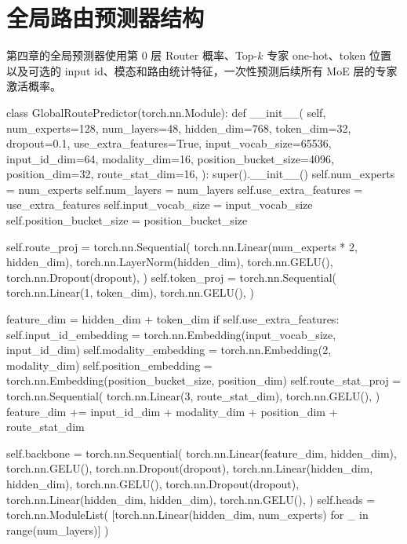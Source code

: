 \section{全局路由预测器结构}
第四章的全局预测器使用第 0 层 Router 概率、Top-$k$ 专家 one-hot、token 位置以及可选的 input id、模态和路由统计特征，一次性预测后续所有 MoE 层的专家激活概率。
\begin{CodeBlock}
class GlobalRoutePredictor(torch.nn.Module):
    def __init__(
        self,
        num_experts=128,
        num_layers=48,
        hidden_dim=768,
        token_dim=32,
        dropout=0.1,
        use_extra_features=True,
        input_vocab_size=65536,
        input_id_dim=64,
        modality_dim=16,
        position_bucket_size=4096,
        position_dim=32,
        route_stat_dim=16,
    ):
        super().__init__()
        self.num_experts = num_experts
        self.num_layers = num_layers
        self.use_extra_features = use_extra_features
        self.input_vocab_size = input_vocab_size
        self.position_bucket_size = position_bucket_size

        self.route_proj = torch.nn.Sequential(
            torch.nn.Linear(num_experts * 2, hidden_dim),
            torch.nn.LayerNorm(hidden_dim),
            torch.nn.GELU(),
            torch.nn.Dropout(dropout),
        )
        self.token_proj = torch.nn.Sequential(
            torch.nn.Linear(1, token_dim),
            torch.nn.GELU(),
        )

        feature_dim = hidden_dim + token_dim
        if self.use_extra_features:
            self.input_id_embedding = torch.nn.Embedding(input_vocab_size, input_id_dim)
            self.modality_embedding = torch.nn.Embedding(2, modality_dim)
            self.position_embedding = torch.nn.Embedding(position_bucket_size, position_dim)
            self.route_stat_proj = torch.nn.Sequential(
                torch.nn.Linear(3, route_stat_dim),
                torch.nn.GELU(),
            )
            feature_dim += input_id_dim + modality_dim + position_dim + route_stat_dim

        self.backbone = torch.nn.Sequential(
            torch.nn.Linear(feature_dim, hidden_dim),
            torch.nn.GELU(),
            torch.nn.Dropout(dropout),
            torch.nn.Linear(hidden_dim, hidden_dim),
            torch.nn.GELU(),
            torch.nn.Dropout(dropout),
            torch.nn.Linear(hidden_dim, hidden_dim),
            torch.nn.GELU(),
        )
        self.heads = torch.nn.ModuleList(
            [torch.nn.Linear(hidden_dim, num_experts) for _ in range(num_layers)]
        )


\end{CodeBlock}
